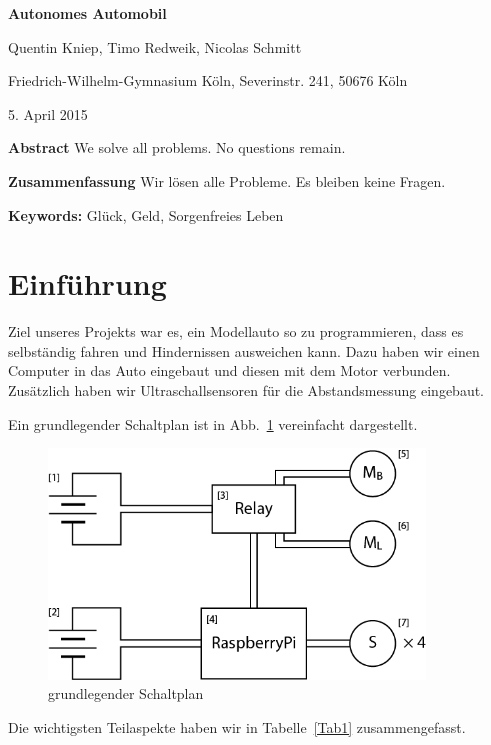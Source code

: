 \documentclass[a4paper,12pt]{article}
\begin{document}
{\Large\bf Autonomes Automobil}

\medskip

Quentin Kniep, Timo Redweik, Nicolas Schmitt

\medskip

Friedrich-Wilhelm-Gymnasium K\"oln, Severinstr. 241, 50676 K\"oln

\medskip

5. April  2015

\medskip

{\bf  Abstract}
{\small We solve all problems. No questions remain.}

\medskip

{\bf  Zusammenfassung}
{\small Wir l\"osen alle Probleme. Es bleiben keine Fragen.}

\medskip

{\bf  Keywords:}
{\small Gl\"uck, Geld, Sorgenfreies Leben}

\bigskip


\section{Einf\"uhrung}\label{sec1}

Ziel unseres Projekts war es, ein Modellauto so zu programmieren, dass es selbst\"andig fahren und Hindernissen ausweichen kann.
Dazu haben wir einen Computer in das Auto eingebaut und diesen mit dem Motor verbunden.
Zus\"atzlich haben wir Ultraschallsensoren f\"ur die Abstandsmessung eingebaut.

Ein grundlegender Schaltplan ist in Abb.~\ref{Fig1} vereinfacht dargestellt.

\begin{figure}[h]
	\centering
	\includegraphics[width=10cm]{./media/circuit_general.png}
	\caption{grundlegender Schaltplan}
	\label{Fig1}
\end{figure}

Die wichtigsten Teilaspekte haben wir in Tabelle~\ref{Tab1} zusammengefasst.
\end{document}
